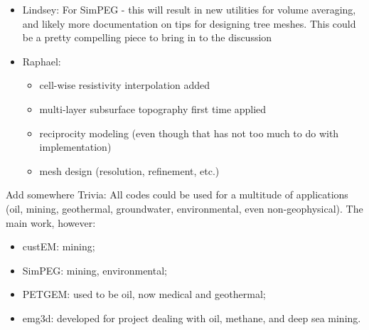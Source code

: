 \documentclass[
    paper,
  ]{geophysics}
\begin{document}
\begin{itemize}
    \item Lindsey: For SimPEG - this will result in new utilities for volume averaging, and likely more documentation on tips for designing tree meshes. This could be a pretty compelling piece to bring in to the discussion
    \item Raphael:
    \begin{itemize}
        \item cell-wise resistivity interpolation added
        \item multi-layer subsurface topography first time applied
        \item reciprocity modeling (even though that has not too much to do with implementation)
        \item mesh design (resolution, refinement, etc.)
    \end{itemize}
\end{itemize}

Add somewhere Trivia: All codes could be used for a multitude of applications (oil, mining, geothermal, groundwater, environmental, even non-geophysical). The main work, however:
\begin{itemize}
    \item custEM: mining;
    \item SimPEG: mining, environmental;
    \item PETGEM: used to be oil, now medical and geothermal;
    \item emg3d: developed for project dealing with oil, methane, and deep sea mining.
\end{itemize}
\end{document}
